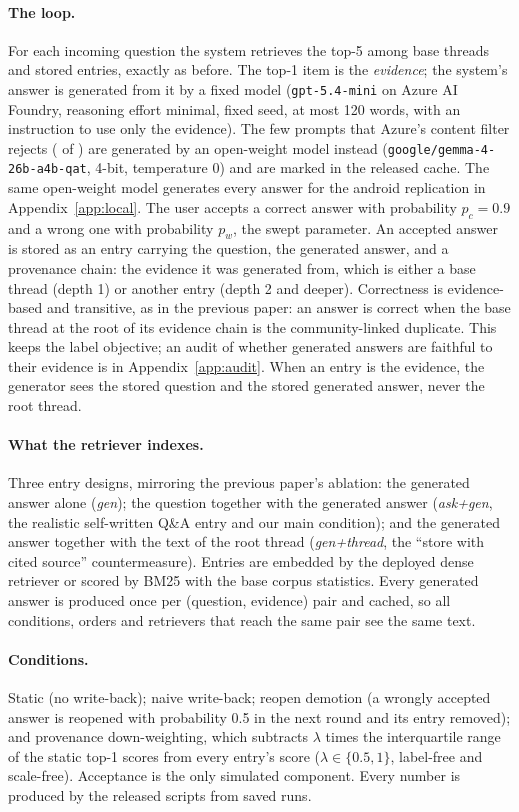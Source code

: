 \documentclass[11pt]{article}
\begin{document}
\paragraph{The loop.} For each incoming question the system retrieves the top-5 among base threads and stored entries, exactly as before. The top-1 item is the \emph{evidence}; the system's answer is generated from it by a fixed model (\texttt{gpt-5.4-mini} on Azure AI Foundry, reasoning effort minimal, fixed seed, at most 120 words, with an instruction to use only the evidence). The few prompts that Azure's content filter rejects (\nFilteredGen{} of \nGenTotal{}) are generated by an open-weight model instead (\texttt{google/gemma-4-26b-a4b-qat}, 4-bit, temperature 0) and are marked in the released cache. The same open-weight model generates every answer for the android replication in Appendix~\ref{app:local}. The user accepts a correct answer with probability $p_c=0.9$ and a wrong one with probability $p_w$, the swept parameter. An accepted answer is stored as an entry carrying the question, the generated answer, and a provenance chain: the evidence it was generated from, which is either a base thread (depth 1) or another entry (depth 2 and deeper). Correctness is evidence-based and transitive, as in the previous paper: an answer is correct when the base thread at the root of its evidence chain is the community-linked duplicate. This keeps the label objective; an audit of whether generated answers are faithful to their evidence is in Appendix~\ref{app:audit}. When an entry is the evidence, the generator sees the stored question and the stored generated answer, never the root thread.

\paragraph{What the retriever indexes.} Three entry designs, mirroring the previous paper's ablation: the generated answer alone (\emph{gen}); the question together with the generated answer (\emph{ask+gen}, the realistic self-written Q\&A entry and our main condition); and the generated answer together with the text of the root thread (\emph{gen+thread}, the ``store with cited source'' countermeasure). Entries are embedded by the deployed dense retriever or scored by BM25 with the base corpus statistics. Every generated answer is produced once per (question, evidence) pair and cached, so all conditions, orders and retrievers that reach the same pair see the same text.

\paragraph{Conditions.} Static (no write-back); naive write-back; reopen demotion (a wrongly accepted answer is reopened with probability 0.5 in the next round and its entry removed); and provenance down-weighting, which subtracts $\lambda$ times the interquartile range of the static top-1 scores from every entry's score ($\lambda\in\{0.5,1\}$, label-free and scale-free). Acceptance is the only simulated component. Every number is produced by the released scripts from saved runs.
\end{document}
